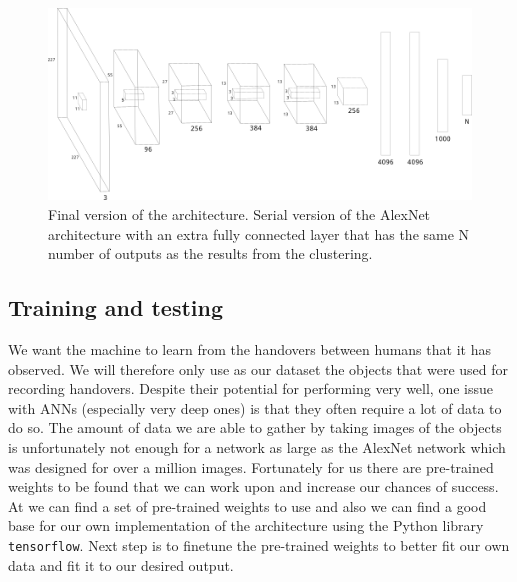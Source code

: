 \begin{figure}
	\centering
	\includegraphics[width=\textwidth]{img/methods/network.png}
	\caption{Final version of the architecture. Serial version of the AlexNet architecture with an extra fully connected layer that has the same N number of outputs as the results from the clustering.}
	\label{fig:method_cnn_arch}
\end{figure}

\subsection{Training and testing}

We want the machine to learn from the handovers between humans that it has observed. We will therefore only use as our dataset the objects that were used for recording handovers. Despite their potential for performing very well, one issue with ANNs (especially very deep ones) is that they often require a lot of data to do so. The amount of data we are able to gather by taking images of the objects is unfortunately not enough for a network as large as the AlexNet network which was designed for over a million images. Fortunately for us there are pre-trained weights to be found that we can work upon and increase our chances of success. At \parencite{AlexNetImplWeights} we can find a set of pre-trained weights to use and also we can find a good base for our own implementation of the architecture using the Python library \texttt{tensorflow}.  Next step is to finetune the pre-trained weights to better fit our own data and fit it to our desired output.

